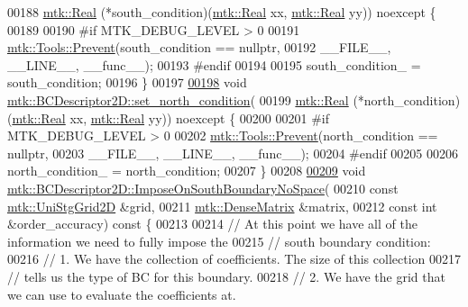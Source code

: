 \begin{DoxyCode}
00188     \hyperlink{group__c01-roots_gac080bbbf5cbb5502c9f00405f894857d}{mtk::Real} (*south\_condition)(\hyperlink{group__c01-roots_gac080bbbf5cbb5502c9f00405f894857d}{mtk::Real} xx, \hyperlink{group__c01-roots_gac080bbbf5cbb5502c9f00405f894857d}{mtk::Real} yy)) noexcept \{
00189 
00190 \textcolor{preprocessor}{  #if MTK\_DEBUG\_LEVEL > 0}
00191   \hyperlink{classmtk_1_1Tools_a332324c6f25e66be9dff48c5987a3b9f}{mtk::Tools::Prevent}(south\_condition == \textcolor{keyword}{nullptr},
00192                       \_\_FILE\_\_, \_\_LINE\_\_, \_\_func\_\_);
00193 \textcolor{preprocessor}{  #endif}
00194 
00195   south\_condition\_ = south\_condition;
00196 \}
00197 
\hypertarget{mtk__bc__descriptor__2d_8cc_source_l00198}{}\hyperlink{classmtk_1_1BCDescriptor2D_a690f6881a88b202c074d9f90f2a7ddb0}{00198} \textcolor{keywordtype}{void} \hyperlink{classmtk_1_1BCDescriptor2D_a690f6881a88b202c074d9f90f2a7ddb0}{mtk::BCDescriptor2D::set\_north\_condition}(
00199     \hyperlink{group__c01-roots_gac080bbbf5cbb5502c9f00405f894857d}{mtk::Real} (*north\_condition)(\hyperlink{group__c01-roots_gac080bbbf5cbb5502c9f00405f894857d}{mtk::Real} xx, \hyperlink{group__c01-roots_gac080bbbf5cbb5502c9f00405f894857d}{mtk::Real} yy)) noexcept \{
00200 
00201 \textcolor{preprocessor}{  #if MTK\_DEBUG\_LEVEL > 0}
00202   \hyperlink{classmtk_1_1Tools_a332324c6f25e66be9dff48c5987a3b9f}{mtk::Tools::Prevent}(north\_condition == \textcolor{keyword}{nullptr},
00203                       \_\_FILE\_\_, \_\_LINE\_\_, \_\_func\_\_);
00204 \textcolor{preprocessor}{  #endif}
00205 
00206   north\_condition\_ = north\_condition;
00207 \}
00208 
\hypertarget{mtk__bc__descriptor__2d_8cc_source_l00209}{}\hyperlink{classmtk_1_1BCDescriptor2D_a0188a64f242ae6015385a4597934fcda}{00209} \textcolor{keywordtype}{void} \hyperlink{classmtk_1_1BCDescriptor2D_a0188a64f242ae6015385a4597934fcda}{mtk::BCDescriptor2D::ImposeOnSouthBoundaryNoSpace}(
00210     \textcolor{keyword}{const} \hyperlink{classmtk_1_1UniStgGrid2D}{mtk::UniStgGrid2D} &grid,
00211     \hyperlink{classmtk_1_1DenseMatrix}{mtk::DenseMatrix} &matrix,
00212     \textcolor{keyword}{const} \textcolor{keywordtype}{int} &order\_accuracy)\textcolor{keyword}{ const }\{
00213 
00214   \textcolor{comment}{// At this point we have all of the information we need to fully impose the}
00215   \textcolor{comment}{// south boundary condition:}
00216   \textcolor{comment}{// 1. We have the collection of coefficients. The size of this collection}
00217   \textcolor{comment}{// tells us the type of BC for this boundary.}
00218   \textcolor{comment}{// 2. We have the grid that we can use to evaluate the coefficients at.}

\end{DoxyCode}
